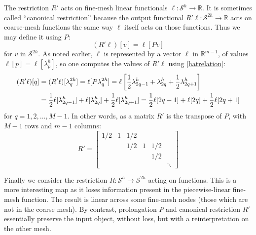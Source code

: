 \documentclass[letterpaper,final,12pt,reqno]{amsart}
\newcommand{\RR}{\mathbb{R}}
\begin{document}
The restriction $R'$ acts on fine-mesh linear functionals $\ell:\mathcal{S}^h \to \RR$.  It is sometimes called ``canonical restriction'' \cite{GraeserKornhuber2009} because the output functional $R'\ell:\mathcal{S}^{2h}\to \RR$ acts on coarse-mesh functions the same way $\ell$ itself acts on those functions.  Thus we may define it using $P$:
\begin{equation}
  (R'\ell)[v] = \ell[Pv]  \label{rprimedefinition}
\end{equation}
for $v$ in $\mathcal{S}^{2h}$.  As noted earlier, $\ell$ is represented by a vector $\bm{\ell}$ in $\RR^{m-1}$, of values $\ell[p] = \ell[\lambda_p^h]$, so one computes the values of $R'\ell$ using \eqref{hatrelation}:
\begin{align}
  (R'\ell)[q] &= (R'\ell)[\lambda_q^{2h}] = \ell[P\lambda_q^{2h}] = \ell\left[\frac{1}{2} \lambda_{2q-1}^h + \lambda_{2q}^h + \frac{1}{2} \lambda_{2q+1}^h\right]  \label{rprimeformula} \\
      &= \frac{1}{2} \ell[\lambda_{2q-1}^h] + \ell[\lambda_{2q}^h] + \frac{1}{2} \ell[\lambda_{2q+1}^h] = \frac{1}{2} \ell[2q-1] + \ell[2q] + \frac{1}{2} \ell[2q+1]  \notag
\end{align}
for $q=1,2,\dots,M-1$.  In other words, as a matrix $R'$ is the transpose of $P$, with $M-1$ rows and $m-1$ columns:
\begin{equation}
R' = \begin{bmatrix}
1/2 & 1 & 1/2 &   &     & \\
    &   & 1/2 & 1 & 1/2 & \\
    &   &     &   & 1/2 & \\
    &   &     &   &     & \ddots
\end{bmatrix} \label{rprimematrix}
\end{equation}

Finally we consider the restriction $R:\mathcal{S}^h\to\mathcal{S}^{2h}$ acting on functions.  This is a more interesting map as it loses information present in the piecewise-linear fine-mesh function.  The result is linear across some fine-mesh nodes (those which are not in the coarse mesh).  By contrast, prolongation $P$ and canonical restriction $R'$ essentially preserve the input object, without loss, but with a reinterpretation on the other mesh.

\newcommand{\Rpr}{R_{\text{pr}}}
\newcommand{\Rin}{R_{\text{in}}}
\newcommand{\Rfw}{R_{\text{fw}}}
\end{document}
